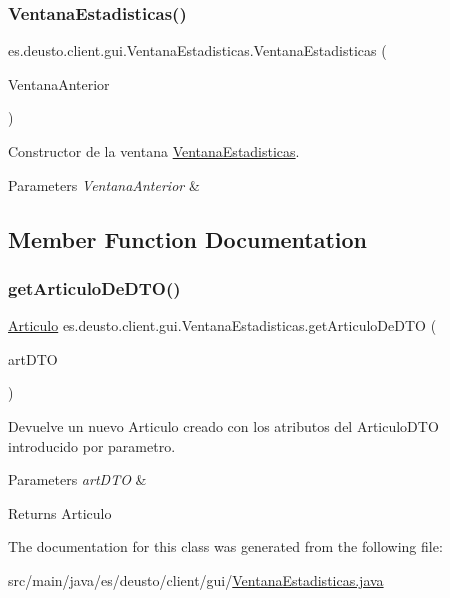 \subsubsection{\texorpdfstring{VentanaEstadisticas()}{VentanaEstadisticas()}}
{\footnotesize\ttfamily es.\+deusto.\+client.\+gui.\+Ventana\+Estadisticas.\+Ventana\+Estadisticas (\begin{DoxyParamCaption}\item[{J\+Frame}]{Ventana\+Anterior }\end{DoxyParamCaption})}

Constructor de la ventana \mbox{\hyperlink{classes_1_1deusto_1_1client_1_1gui_1_1_ventana_estadisticas}{Ventana\+Estadisticas}}. 
\begin{DoxyParams}{Parameters}
{\em Ventana\+Anterior} & \\
\hline
\end{DoxyParams}


\subsection{Member Function Documentation}
\mbox{\label{classes_1_1deusto_1_1client_1_1gui_1_1_ventana_estadisticas_a5b9c9a6b32f98ebd348e429ee8a2b54c}} 
\subsubsection{\texorpdfstring{getArticuloDeDTO()}{getArticuloDeDTO()}}
{\footnotesize\ttfamily \mbox{\hyperlink{classes_1_1deusto_1_1client_1_1data_1_1_articulo}{Articulo}} es.\+deusto.\+client.\+gui.\+Ventana\+Estadisticas.\+get\+Articulo\+De\+D\+TO (\begin{DoxyParamCaption}\item[{\mbox{\hyperlink{classes_1_1deusto_1_1server_1_1dto_1_1_articulo_d_t_o}{Articulo\+D\+TO}}}]{art\+D\+TO }\end{DoxyParamCaption})}

Devuelve un nuevo Articulo creado con los atributos del Articulo\+D\+TO introducido por parametro. 
\begin{DoxyParams}{Parameters}
{\em art\+D\+TO} & \\
\hline
\end{DoxyParams}
\begin{DoxyReturn}{Returns}
Articulo 
\end{DoxyReturn}


The documentation for this class was generated from the following file\+:\begin{DoxyCompactItemize}
\item 
src/main/java/es/deusto/client/gui/\mbox{\hyperlink{_ventana_estadisticas_8java}{Ventana\+Estadisticas.\+java}}\end{DoxyCompactItemize}
